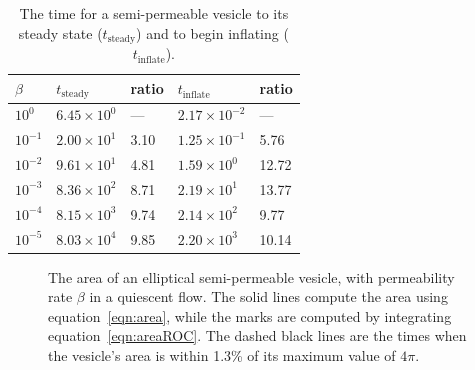 \documentclass[aps,prl,showpacs]{revtex4}
\newif\ifTikz
\begin{document}
\begin{table}[htp]
  \centering
  \begin{tabular}{|C{2cm}C{3cm}C{3cm}C{3cm}C{3cm}|}
    \hline
    $\beta$ & $t_\mathrm{steady}$ & ratio & $t_\mathrm{inflate}$ & ratio \\
    \hline
    $10^{0}$  & $6.45 \times 10^{0}$ & ---  
              & $2.17 \times 10^{-2}$ & --- \\ 
    $10^{-1}$ & $2.00 \times 10^{1}$ & 3.10 & 
                $1.25 \times 10^{-1}$ & 5.76 \\
    $10^{-2}$ & $9.61 \times 10^{1}$ & 4.81 & 
                $1.59 \times 10^{0}$ & 12.72 \\
    $10^{-3}$ & $8.36 \times 10^{2}$ & 8.71 & 
                $2.19 \times 10^{1}$ & 13.77 \\
    $10^{-4}$ & $8.15 \times 10^{3}$ & 9.74 & 
                $2.14 \times 10^{2}$ & 9.77 \\
    $10^{-5}$ & $8.03 \times 10^{4}$ & 9.85 & 
                $2.20 \times 10^{3}$ & 10.14 \\
    \hline
  \end{tabular}
  \caption{\label{tbl:ellipseRelaxTimes} The time for a semi-permeable
  vesicle to its steady state ($t_\mathrm{steady}$) and to begin
  inflating ($t_\mathrm{inflate}$).}
\end{table}


\begin{figure}[htp]
\centering
\ifTikz

\fi
  \caption{\label{fig:ellipseArea} The area of an elliptical
  semi-permeable vesicle, with permeability rate $\beta$ in a quiescent
  flow. The solid lines compute the area using
  equation~\eqref{eqn:area}, while the marks are computed by integrating
  equation~\eqref{eqn:areaROC}. The dashed black lines are the times
  when the vesicle's area is within 1.3\% of its maximum value of
  $4\pi$.}
\end{figure}
\end{document}
